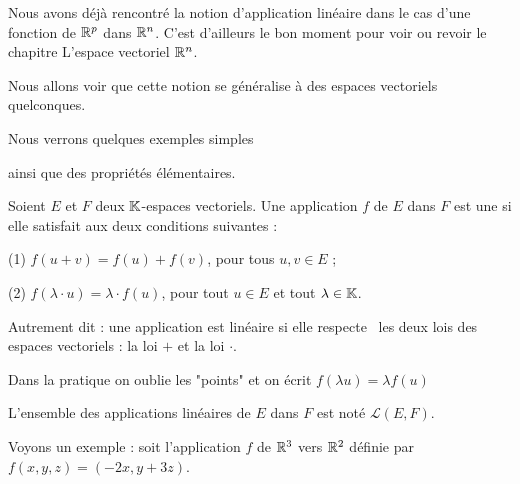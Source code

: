 







\debuttexte


\diapo

\change

Nous avons déjà rencontré la notion d'application linéaire dans le cas 
d'une fonction de $\mathbb{R}^p$ dans $\mathbb{R}^n$.
C'est d'ailleurs le bon moment pour voir ou revoir le chapitre 
\og L'espace vectoriel $\mathbb{R}^n$.

\change


Nous allons voir que cette notion se généralise à des espaces vectoriels quelconques. 

\change

Nous verrons quelques exemples simples

\change

ainsi que des propriétés élémentaires.

\diapo




Soient $E$ et $F$ deux $\mathbb{K}$-espaces vectoriels. 
Une application $f$ de $E$ dans $F$ est une  si elle satisfait aux deux conditions suivantes : 

\change

(1)  $f(u+v)=f(u)+f(v)$, pour tous $u, v \in  E$ ;

\change

(2) $f(\lambda \cdot u)=\lambda \cdot f(u)$, pour tout $u \in E$ et tout $\lambda \in \mathbb{K}$.


Autrement dit : une application est linéaire si elle 
\og respecte \fg\ les deux lois des espaces vectoriels : la loi $+$ et la loi $\cdot$.

Dans la pratique on oublie les "points" et on écrit $f(\lambda u)=\lambda f(u)$


\change

L'ensemble des applications linéaires de $E$ dans $F$ est noté $\mathcal{L}(E,F)$.

\diapo
Voyons un exemple : soit l'application $f$
de $\mathbb{R}^3$ vers $\mathbb{R}^2$
définie par $f(x,y,z) = (-2x,y+3z)$.

\change

